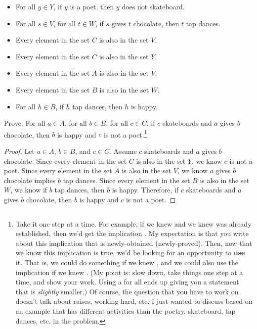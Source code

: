 \documentclass{article}
\begin{document}
\begin{enumerate}
          \begin{itemize}
              \item For all $y \in Y$, if $y$ is a poet, then $y$ does not skateboard.
              \item For all $s \in V$, for all $t \in W$, if $s$ gives $t$ chocolate, then $t$ tap
                    dances.
              \item Every element in the set $C$ is also in the set $V$.
              \item Every element in the set $C$ is also in the set $Y$.
              \item Every element in the set $A$ is also in the set $V$.
              \item Every element in the set $B$ is also in the set $W$.
              \item For all $h \in B$, if $h$ tap dances, then $h$ is happy.
          \end{itemize}
          Prove: For all $a \in A$, for all $b \in B$, for all $c \in C$, if $c$ skateboards and $a$ gives $b$ chocolate, then $b$ is happy and $c$ is not a poet.\footnote{Take it one step at a time. For example, if we knew  and we knew  was already established, then we'd get the implication . My expectation is that you write about this implication that is newly-obtained (newly-proved). Then, now that we know this implication is true, we'd be looking for an opportunity to {\bf use} it. That is, we could do something if we knew , and we could also use the implication if we knew . (My point is: slow down, take things one step at a time, and show your work. Using a for all ends up giving you a statement that is \emph{slightly} smaller.) Of course, the question that you have to work on doesn't talk about raises, working hard, etc. I just wanted to discuss based on an example that has different activities than the poetry, skateboard, tap dances, etc. in the problem.}

          \begin{proof}
              Let $a \in A$, $b \in B$, and $c \in C$. Assume $c$ skateboards and $a$ gives $b$ chocolate.
              Since every element in the set $C$ is also in the set $Y$, we know $c$ is not a poet.
              Since every element in the set $A$ is also in the set $V$, we know $a$ gives $b$ chocolate implies $b$ tap dances.
              Since every element in the set $B$ is also in the set $W$, we know if $b$ tap dances, then $b$ is happy.
              Therefore, if $c$ skateboards and $a$ gives $b$ chocolate, then $b$ is happy and $c$ is not a poet.
          \end{proof}


\end{enumerate}
\end{document}
